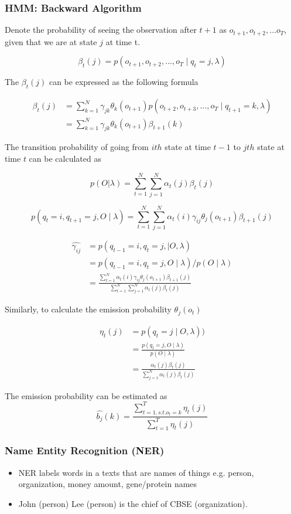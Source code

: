 \documentclass[notheorems, aspectratio=54]{beamer}
\begin{document}
\begin{frame}

\frametitle{HMM: Backward Algorithm}
Denote the probability of seeing the observation after $t+1$ as $o_{t+1} , o_{t+2}, ...o_{T}$, given that we are at state $j$ at time t. 

$$
\beta_t(j)=p(o_{t+1}, o_{t+2}, ..., o_T\mid q_{t}=j, \lambda)
$$

The $\beta_t(j)$ can be expressed as the following formula

\begin{align*}
\beta_{t}(j)
&=\sum\limits_{k=1}^{N}\gamma_{jk}\theta_{k}(o_{t+1})p(o_{t+2}, o_{t+3}, ..., o_T\mid q_{t+1}=k, \lambda)\\
&=\sum\limits_{k=1}^{N}\gamma_{jk}\theta_{k}(o_{t+1})\beta_{t+1}(k)
\end{align*}
\end{frame}

\begin{frame}
The transition probability of going from $ith$ state at time $t-1$ to $jth$ state at time $t$ can be calculated as

$$
p(O|\lambda)=\sum\limits_{t=1}^N\sum\limits_{j=1}^{N} \alpha_{t}(j)\beta_{t}(j)
$$

$$
p(q_{t}=i, q_{t+1}=j, O \mid \lambda)=\sum\limits_{t=1}^N\sum\limits_{j=1}^{N}\alpha_{t}(i)\gamma_{ij}\theta_{j}(o_{t+1})\beta_{t+1}(j)
$$

\begin{align*}
\hat{\gamma_{ij}}
&=p(q_{t-1}=i, q_t=j, \mid O, \lambda)\\
&=p(q_{t-1}=i, q_t=j, O \mid \lambda)/p(O \mid \lambda)\\
&=\frac{\sum\limits_{t=1}^N\alpha_{t}(i)\gamma_{ij}\theta_{j}(o_{t+1})\beta_{t+1}(j)}{\sum\limits_{t=1}^N\sum\limits_{j=1}^{N} \alpha_{t}(j)\beta_{t}(j)}
\end{align*}
\end{frame}

\begin{frame}
Similarly, to calculate the emission probability $\theta_j(o_t)$

\begin{align*}
\eta_t(j)
&=p(q_t=j \mid O, \lambda))\\
&=\frac{p(q_t=j, O \mid \lambda)}{p(O \mid \lambda)}\\
&=\frac{\alpha_t(j)\beta_t(j)}{\sum\limits_{j=1}^{N}\alpha_t(j)\beta_t(j)}
\end{align*}


The emission probability can be estimated as 
$$
\hat{b_j}(k)=\frac{\sum\limits_{t=1, s.t. o_t=k}^{T}\eta_t(j)}{\sum\limits_{t=1}^{T}\eta_t(j)}
$$

\end{frame}


\begin{frame}
\frametitle{Name Entity Recognition (NER)}
\begin{itemize}
\item NER labels words in a texts that are names of things e.g. person, organization, money amount, gene/protein names
\item John (person) Lee (person) is the chief of CBSE (organization). 
\end{itemize}
\end{frame}
\end{document}
